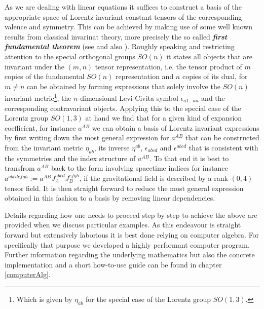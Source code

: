 \documentclass[a4paper,12pt, DIV=14, BCOR=5mm, twoside, headsepline, numbers=noenddot]{scrbook}
\begin{document}
As we are dealing with linear equations it suffices to construct a basis of the appropriate space of Lorentz invariant constant tensors of the corresponding valence and symmetry. This can be achieved by making use of some well known results from classical invarinat theory, more precisely the so called \textit{\textbf{first fundamental theorem}} (see \cite{Aslaksen1995InvariantTO} and also \cite{PROCESI1976306}). Roughly speaking and restricting attention to the special orthogonal groups $SO(n)$ it states all objects that are invariant under the $(m,n)$ tensor representation, i.e. the tensor product of $m$ copies of the fundamental $SO(n)$ representation and $n$ copies of its dual, for $m \neq n$ can be obtained by forming expressions that solely involve the $SO(n)$ invariant metric\footnote{Which is given by $\eta_{ab}$ for the special case of the Lorentz group $SO(1,3)$.}, the $n$-dimensional Levi-Civita symbol $\epsilon_{a1...an}$ and the corresponding contravariant objects. Applying this to the special case of the Lorentz group $SO(1,3)$ at hand we find that for a given kind of expansion coefficient, for instance $a^{AB}$ we can obtain a basis of Lorentz invariant expressions by first writing down the most general expression for $a^{AB}$ that can be constructed from the invariant metric $\eta_{ab}$, its inverse $\eta^{ab}$, $\epsilon_{abcd}$ and $\epsilon^{abcd}$ that is consistent with the symmetries and the index structure of $a^{AB}$. To that end it is best to transfrom $a^{AB}$ back to the form involving spacetime indices for instance $a^{abcdefgh} := a^{AB}J_A^{abcd}J_B^{efgh}$, if the gravitational field is described by a rank $(0,4)$ tensor field. It is then straight forward to reduce the most general expression obtained in this fashion to a basis by removing linear dependencies.

Details regarding how one needs to proceed step by step to achieve the above are provided when we discuss particular examples. As this endeavour is straight forward but extensively laborious it is best done relying on computer algebra. For specifically that purpose we developed a highly performant computer program. 
Further information regarding the underlying mathematics but also the concrete implementation and a short how-to-use guide can be found in chapter \ref{computerAlg}. \\
\end{document}

